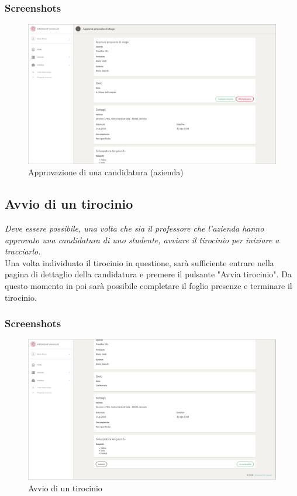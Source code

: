 \subsubsection{Screenshots}
\begin{figure}[H]
	\centering
	\includegraphics[width=1\textwidth]{Figs/screenshots/internshipproposalapprovecompany}     
	\caption[Screenshot: approvazione di una candidatura (azienda)]{Approvazione di una candidatura (azienda)}
	\label{fig:screenshot:6}
\end{figure}

\pagebreak
\subsection{Avvio di un tirocinio}

\textit{Deve essere possibile, una volta che sia il professore che l'azienda hanno approvato una candidatura di uno studente, avviare il tirocinio per iniziare a tracciarlo.} \\

\noindent
Una volta individuato il tirocinio in questione, sarà sufficiente entrare nella pagina di dettaglio della candidatura e premere il pulsante "Avvia tirocinio". Da questo momento in poi sarà possibile completare il foglio presenze e terminare il tirocinio.

\subsubsection{Screenshots}
\begin{figure}[H]
	\centering
	\includegraphics[width=1\textwidth]{Figs/screenshots/internshipproposalstart}     
	\caption[Screenshot: avvio di un tirocinio]{Avvio di un tirocinio}
	\label{fig:screenshot:7}
\end{figure}

